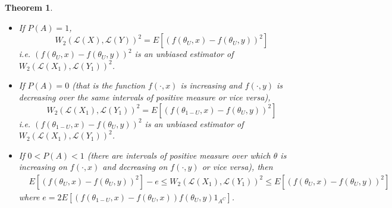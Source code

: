 \documentclass{article}
\theoremstyle{plain}%
\newtheorem{theorem}{Theorem}[section]
\theoremstyle{definition}
\theoremstyle{remark}
\begin{document}
\begin{theorem}
		\begin{itemize}
			\item If $P(A)=1$,%
			\begin{equation}\label{eqn:probA1}
				W_{2}(\mathcal{L}(X),\mathcal{L}(Y))^2 %
				= E[(f(\theta_U, x)-f(\theta_U, y))^2]
			\end{equation}
			i.e. $(f(\theta_U,x)-f(\theta_U,y))^2$ is an unbiased estimator of $W_2(\mathcal{L}(X_1),\mathcal{L}(Y_1))^2$.
			\item If $P(A)=0$ (that is the function $f(\cdot,x)$ is increasing and $f(\cdot,y)$ is decreasing over the same intervals of positive measure or vice versa),
			\begin{equation}\label{eqn:probA0}
				W_{2}(\mathcal{L}(X_1),\mathcal{L}(Y_1))^2 %
				= E[(f(\theta_{1-U}, x)-f(\theta_U, y))^2]
			\end{equation}
			i.e. $(f(\theta_{1-U},x)-f(\theta_U,y))^2$ is an unbiased estimator of $W_2(\mathcal{L}(X_1),\mathcal{L}(Y_1))^2$.
			\item
			If $0<P(A)<1$ (there are intervals of positive measure over which $\theta$ is increasing on $f(\cdot,x)$ and decreasing on $f(\cdot,y)$ or vice versa), then
			\begin{align}\label{eqn:probA01}
				&E[(f(\theta_U, x)-f(\theta_U, y))^2] - e
				\le W_{2}(\mathcal{L}(X_1),\mathcal{L}(Y_1))^2  
				\le E[(f(\theta_U, x)-f(\theta_U, y))^2]
			\end{align}
			where $e = 2 E[(f(\theta_{1-U}, x) - f(\theta_U, x)) f(\theta_U, y) 1_{A^C}]$.
		\end{itemize}
	\end{theorem}
	
\end{document}
